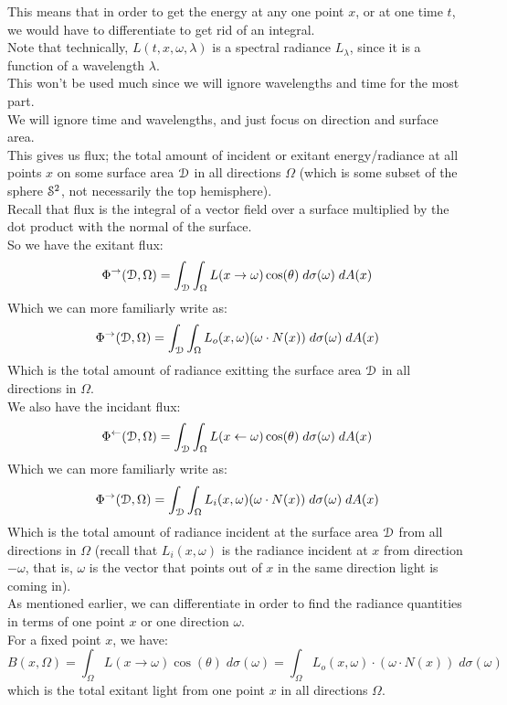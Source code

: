 \documentclass[12pt]{article}
\begin{document}
This means that in order to get the energy
at any one point $x$, or at one time $t$,
we would have to differentiate to get rid
of an integral. \\

Note that technically, $L(t, x, \omega, \lambda)$
is a spectral radiance $L_\lambda$, 
since it is a function
of a wavelength $\lambda$. \\
This won't be used much since we will
ignore wavelengths and time for the most part. \\

We will ignore time and wavelengths,
and just focus on direction and surface area. \\
This gives us flux;
the total amount of incident or exitant
energy/radiance at all points $x$
on some surface area $\mathcal{D}$ in all directions
$\Omega$ (which is some subset of the sphere $\mathcal{S}^2$,
not necessarily the top hemisphere).  \\
Recall that flux is the integral of a vector
field over a surface multiplied by the dot product
with the normal of the surface. \\ 

So we have the exitant flux:
\[ \Phi^{\to}(\mathcal{D}, \Omega)
= \int_{\mathcal{D}} \int_\Omega L(x \to \omega) \cos(\theta) \;
d\sigma(\omega) \; dA(x) \]
Which we can more familiarly write as:
\[ \Phi^{\to}(\mathcal{D}, \Omega) 
= \int_{\mathcal{D}} \int_\Omega L_o(x, \omega) 
(\omega \cdot N(x)) \; d\sigma(\omega) \; dA(x)  \]
Which is the total amount of radiance exitting
the surface area $\mathcal{D}$ in all directions 
in $\Omega$. \\

We also have the incidant flux:
\[ \Phi^{\leftarrow}(\mathcal{D}, \Omega)
= \int_{\mathcal{D}} \int_\Omega L(x \leftarrow \omega) \cos(\theta) \;
d\sigma(\omega) \; dA(x) \]
Which we can more familiarly write as:
\[ \Phi^{\to}(\mathcal{D}, \Omega) 
= \int_{\mathcal{D}} \int_\Omega L_i(x, \omega) 
(\omega \cdot N(x)) \; d\sigma(\omega) \; dA(x)  \]
Which is the total amount of radiance incident
at the surface area $\mathcal{D}$ from all directions 
in $\Omega$ (recall that $L_i(x, \omega)$ 
is the radiance incident at $x$ from direction $-\omega$,
that is, $\omega$ is the vector that points out of
$x$ in the same direction light is coming in). \\

As mentioned earlier, we can differentiate in order
to find the radiance quantities in terms of one
point $x$ or one direction $\omega$. \\

For a fixed point $x$, we have:
\[ B(x, \Omega) = \int_\Omega L(x \to \omega) \cos(\theta) \;
d\sigma(\omega) = \int_\Omega L_o(x, \omega) \cdot 
(\omega \cdot N(x)) \; d\sigma(\omega) \]
which is the total exitant light from one point $x$
in all directions $\Omega$. \\
\end{document}
